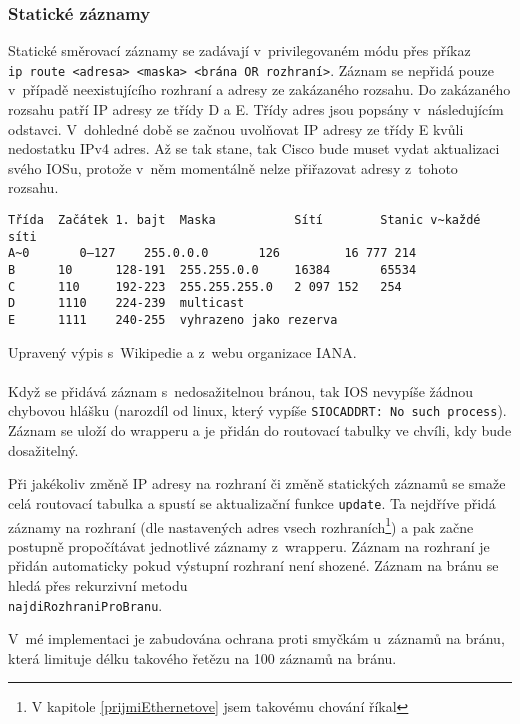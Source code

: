 \subsubsection{Statické záznamy}
Statické směrovací záznamy se zadávají v~privilegovaném módu přes příkaz \\\verb|ip route <adresa> <maska> <brána OR rozhraní>|. Záznam se nepřidá pouze v~případě neexistujícího rozhraní a adresy ze zakázaného rozsahu. Do zakázaného rozsahu patří IP adresy ze třídy D a E. Třídy adres jsou popsány v~následujícím odstavci. V~dohledné době se začnou uvolňovat IP adresy ze třídy E kvůli nedostatku IPv4 adres. Až se tak stane, tak Cisco bude muset vydat aktualizaci svého IOSu, protože v~něm momentálně nelze přiřazovat adresy z~tohoto rozsahu.
\begin{verbatim}
Třída  Začátek 1. bajt  Maska           Sítí        Stanic v~každé síti
A~0       0–127    255.0.0.0       126         16 777 214
B      10      128-191  255.255.0.0     16384       65534
C      110     192-223  255.255.255.0   2 097 152   254
D      1110    224-239  multicast
E      1111    240-255  vyhrazeno jako rezerva
\end{verbatim}
Upravený výpis s~Wikipedie \cite{wiki:ip} a z~webu organizace IANA\cite{iana}.

\paragraph{}
Když se přidává záznam s~nedosažitelnou bránou, tak IOS nevypíše žádnou chybovou hlášku (narozdíl od linux, který vypíše \verb|SIOCADDRT: No such process|). Záznam se uloží do wrapperu a je přidán do routovací tabulky ve chvíli, kdy bude dosažitelný. 

Při jakékoliv změně IP adresy na rozhraní či změně statických záznamů se smaže celá routovací tabulka a spustí se aktualizační funkce \verb|update|. Ta nejdříve přidá záznamy na rozhraní (dle nastavených adres vsech rozhraních\footnote{V kapitole \ref{prijmiEthernetove} jsem takovému chování říkal }) a pak začne postupně propočítávat jednotlivé záznamy z~wrapperu. Záznam na rozhraní je přidán automaticky pokud výstupní rozhraní není shozené. Záznam na bránu se hledá přes rekurzivní metodu \\\verb|najdiRozhraniProBranu|.

V~mé implementaci je zabudována ochrana proti smyčkám u~záznamů na bránu, která limituje délku takového řetězu na 100 záznamů na bránu.

